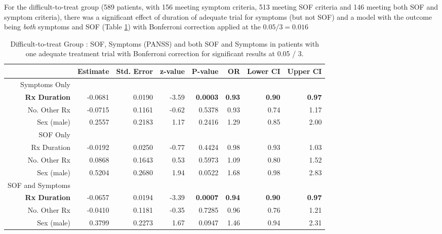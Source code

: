 \documentclass[a4paper,nobib]{article}
\begin{document}
For the difficult-to-treat group (589 patients, with 156 meeting symptom criteria, 513 meeting SOF criteria and 146 meeting both SOF and symptom criteria), there was a significant effect of duration of adequate trial for symptoms (but not SOF) and a model with the outcome being \emph{both} symptoms and SOF (Table \ref{tab-both-glm-D2T}) with Bonferroni correction applied at the $0.05 / 3 = 0.016$ 

\begin{table}[!h]
\begin{center}
\begin{tabular}{rrrrrrrr}
\hline
	& Estimate & Std. Error & z-value & P-value & OR & Lower CI & Upper CI \\ 
\hline
Symptoms Only \\
\hline
\textbf{Rx Duration}&-0.0681 & 0.0190& -3.59 & \textbf{0.0003} & \textbf{0.93} & \textbf{0.90} & \textbf{0.97}\\ 
No. Other Rx &-0.0715 & 0.1161& -0.62 & 0.5378 & 0.93&0.74 & 1.17\\ 
Sex (male) & 0.2557 & 0.2183 & 1.17 & 0.2416 & 1.29&0.85 & 2.00\\ 

\hline
SOF Only \\
\hline
Rx Duration  & -0.0192 & 0.0250 & -0.77 & 0.4424 & 0.98 & 0.93 & 1.03\\ 
No. Other Rx & 0.0868  & 0.1643 & 0.53  & 0.5973 & 1.09 & 0.80 & 1.52\\ 
Sex (male)   & 0.5204  & 0.2680 & 1.94  & 0.0522 & 1.68 & 0.98 & 2.83\\ 
\hline
SOF and Symptoms \\
\hline
\textbf{Rx Duration} & -0.0657 & 0.0194 & -3.39 & \textbf{0.0007} & \textbf{0.94} & \textbf{0.90} & \textbf{0.97}\\ 
No. Other Rx & -0.0410 & 0.1181 & -0.35 & 0.7285 & 0.96 & 0.76 & 1.21\\ 
Sex (male)   & 0.3799  & 0.2273 & 1.67  & 0.0947 & 1.46 & 0.94 & 2.31\\ 
\hline
\end{tabular}
\end{center}
\caption{Difficult-to-treat Group : SOF, Symptoms (PANSS) and both SOF and Symptoms in patients with one adequate treatment trial with Bonferroni correction for significant results at 0.05 / 3.}
\label{tab-both-glm-D2T}
\end{table}
\end{document}
